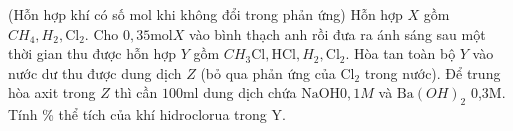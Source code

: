 \begin{vd}
	(Hỗn hợp khí có số mol khi không đổi trong phản ứng)
	Hỗn hợp $X$ gồm $CH_4, H_2, \mathrm{Cl}_2$. Cho $0,35\mathrm{mol} X$ vào bình thạch anh rồi đưa ra ánh sáng sau một thời gian thu được hỗn hợp $Y$ gồm $CH_3 \mathrm{Cl}, \mathrm{HCl}, H_2, \mathrm{Cl}_2$. Hòa tan toàn bộ $Y$ vào nước dư thu được dung dịch $Z$ (bỏ qua phản ứng của $\mathrm{Cl}_2$ trong nước). Để trung hòa axit trong $Z$ thì cần $100\mathrm{ml}$ dung dịch chứa $\mathrm{NaOH} 0,1M$ và $\mathrm{Ba}(OH)_2$ 0,3M. Tính \% thể tích của khí hidroclorua trong Y.
	\loigiai{
	}
\end{vd}

